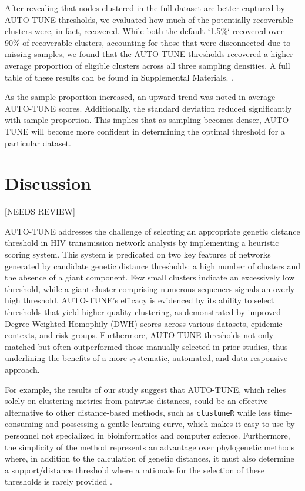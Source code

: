 \documentclass[utf8]{FrontiersinHarvard} %
\newcommand{\TODO}[1]{{\color{red}{#1}}}
\begin{document}
After revealing that nodes clustered in the full dataset are better captured by
AUTO-TUNE thresholds, we evaluated how much of the potentially recoverable
clusters were, in fact, recovered. While both the default `1.5\%` recovered
over 90\% of recoverable clusters, accounting for those that were disconnected
due to missing samples, we found that the AUTO-TUNE thresholds recovered a
higher average proportion of eligible clusters across all three sampling
densities. A full table of these results can be found in Supplemental
Materials. \TODO{Create another visualization}.

As the sample proportion increased, an upward trend was noted in average
AUTO-TUNE scores. Additionally, the standard deviation reduced significantly
with sample proportion. This implies that as sampling becomes denser, AUTO-TUNE
will become more confident in determining the optimal threshold for a
particular dataset.

\section{Discussion}

 [NEEDS REVIEW]


AUTO-TUNE addresses the challenge of selecting an appropriate genetic distance
threshold in HIV transmission network analysis by implementing a heuristic
scoring system. This system is predicated on two key features of networks
generated by candidate genetic distance thresholds: a high number of clusters
and the absence of a giant component. Few small clusters indicate an
excessively low threshold, while a giant cluster comprising numerous sequences
signals an overly high threshold. AUTO-TUNE's efficacy is evidenced by its
ability to select thresholds that yield higher quality clustering, as
demonstrated by improved Degree-Weighted Homophily (DWH) scores across various
datasets, epidemic contexts, and risk groups. Furthermore, AUTO-TUNE thresholds
not only matched but often outperformed those manually selected in prior
studies, thus underlining the benefits of a more systematic, automated, and
data-responsive approach.

For example, the results of our study suggest that AUTO-TUNE, which relies
solely on clustering metrics from pairwise distances, could be an effective
alternative to other distance-based methods, such as {\tt clustuneR} while less
time-consuming and possessing a gentle learning curve, which makes it easy to
use by personnel not specialized in bioinformatics and computer science.
Furthermore, the simplicity of the method represents an advantage over
phylogenetic methods where, in addition to the calculation of genetic
distances, it must also determine a support/distance threshold where a
rationale for the selection of these thresholds is rarely provided
\citep{junqueira_factors_2019}.
\end{document}
